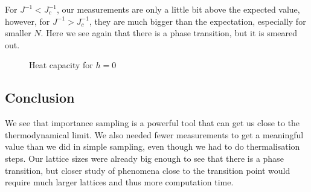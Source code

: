 \documentclass{scrartcl}
\begin{document}
For $J^{-1}<J_c^{-1}$, our measurements are only a little bit above the expected value, however, for $J^{-1}>J_c^{-1}$, they are much bigger than the expectation, especially for smaller $N$. Here we see again that there is a phase transition, but it is smeared out.

	\begin{figure}[htbp]
		
		\caption{Heat capacity for $h=0$}
		\label{fig:heat}
	\end{figure}
	
\subsection{Conclusion}
We see that importance sampling is a powerful tool that can get us close to the thermodynamical limit. We also needed fewer measurements to get a meaningful value than we did in simple sampling, even though we had to do thermalisation steps. Our lattice sizes were already big enough to see that there is a phase transition, but closer study of phenomena close to the transition point would require much larger lattices and thus more computation time.





\newpage	
\listoffigures
\printbibliography
\end{document}
